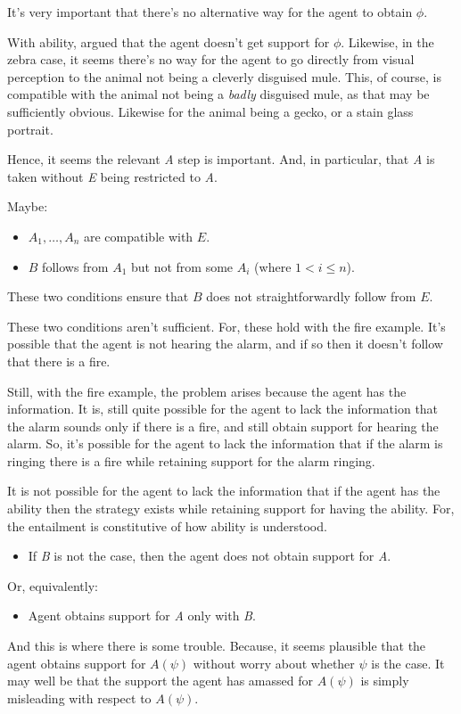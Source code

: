 \documentclass[10pt]{article}
\begin{document}
\begin{note}
  It's very important that there's no alternative way for the agent to obtain \(\phi\).

  With ability, argued that the agent doesn't get support for \(\phi\).
  Likewise, in the zebra case, it seems there's no way for the agent to go directly from visual perception to the animal not being a cleverly disguised mule.
  This, of course, is compatible with the animal not being a \emph{badly} disguised mule, as that may be sufficiently obvious.
  Likewise for the animal being a gecko, or a stain glass portrait.

  Hence, it seems the relevant \emph{A} step is important.
  And, in particular, that \emph{A} is taken without \emph{E} being restricted to \emph{A}.
\end{note}

\begin{note}[Account?]
  Maybe:
  \begin{itemize}
  \item \(A_{1}, \dots, A_{n}\) are compatible with \(E\).
  \item \(B\) follows from \(A_{1}\) but not from some \(A_{i}\) (where \(1 < i \leq n\)).
  \end{itemize}
  These two conditions ensure that \(B\) does not straightforwardly follow from \(E\).

  These two conditions aren't sufficient.
  For, these hold with the fire example.
  It's possible that the agent is not hearing the alarm, and if so then it doesn't follow that there is a fire.

  Still, with the fire example, the problem arises because the agent has the information.
  It is, still quite possible for the agent to lack the information that the alarm sounds only if there is a fire, and still obtain support for hearing the alarm.
  So, it's possible for the agent to lack the information that if the alarm is ringing there is a fire while retaining support for the alarm ringing.

  It is not possible for the agent to lack the information that if the agent has the ability then the strategy exists while retaining support for having the ability.
  For, the entailment is constitutive of how ability is understood.

  \begin{itemize}
  \item If \emph{B} is not the case, then the agent does not obtain support for \emph{A}.
  \end{itemize}
  Or, equivalently:
  \begin{itemize}
  \item Agent obtains support for \emph{A} only with \emph{B}.
  \end{itemize}
  And this is where there is some trouble.
  Because, it seems plausible that the agent obtains support for \(A(\psi)\) without worry about whether \(\psi\) is the case.
  It may well be that the support the agent has amassed for \(A(\psi)\) is simply misleading with respect to \(A(\psi)\).
\end{note}
\end{document}

